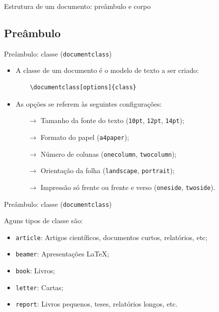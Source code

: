 \documentclass[c]{beamer}
\begin{document}
{\begin{frame}[fragile]{\sc Estrutura de um documento: preâmbulo e corpo}
    \end{frame}

    \subsection{Preâmbulo}
        
        \begin{frame}[fragile]{\sc Preâmbulo: classe (\texttt{documentclass})}
        
	        \begin{itemize}
		    \setlength\itemsep{0.2cm}
		        \item A {\color{blue} classe} de um documento é o modelo de texto a ser criado:
		            \begin{verbatim}
    \documentclass[options]{class}
		            \end{verbatim}
                \item As {\color{blue} opções} se referem às seguintes configurações:
                \begin{itemize}
  	                \item[$\to$] Tamanho da fonte do texto (\verb|10pt|, \verb|12pt|, \verb|14pt|);
                    \item[$\to$] Formato do papel (\verb|a4paper|);
  	                \item[$\to$] Número de colunas (\verb|onecolumn|, \verb|twocolumn|);
  	                \item[$\to$] Orientação da folha (\verb|landscape|, \verb|portrait|);
  	                \item[$\to$] Impressão só frente ou frente e verso (\verb|oneside|, \verb|twoside|).
                \end{itemize}
            \end{itemize}
            
        \end{frame}
        
        \begin{frame}[fragile]{\sc Preâmbulo: classe (\texttt{documentclass})}
            
            Aguns tipos de classe são:
	        \begin{itemize}
	        \setlength\itemsep{0.2cm}
	            \item \verb|article|: Artigos científicos, documentos curtos, relatórios, etc;
	            \item \verb|beamer|: Apresentações \LaTeX;
	            \item \verb|book|: Livros;
	            \item \verb|letter|: Cartas;
	            \item \verb|report|: Livros pequenos, teses, relatórios longos, etc.
            \end{itemize}
            

\end{frame}}
\end{document}
